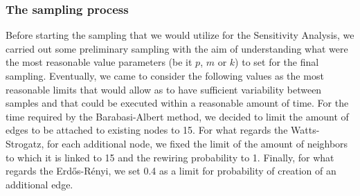 \documentclass{article}
\begin{document}
\subsubsection{The sampling process}
Before starting the sampling that we would utilize for the Sensitivity Analysis, we carried out some preliminary sampling with the aim of understanding what were the most reasonable value parameters (be it $p$, $m$ or $k$) to set for the final sampling.
Eventually, we came to consider the following values as the most reasonable limits that would allow as to have sufficient variability between samples and that could be executed within a reasonable amount of time.
For the time required by the Barabasi-Albert method, we decided to limit the amount of edges to be attached to existing nodes to 15.
For what regards the Watts-Strogatz, for each additional node, we fixed the limit of the amount of neighbors to which it is linked to 15 and the rewiring probability to 1.
Finally, for what regards the Erdős-Rényi, we set 0.4 as a limit for probability of creation of an additional edge.
\end{document}
